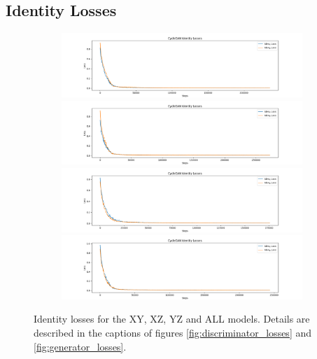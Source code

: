\documentclass[12pt, fleqn, titlepage]{article}
\newcommand{\1}[1]{\mathds{1}\left[#1\right]}
\begin{document}
\subsection{Identity Losses}\label{iden_loss}
\begin{figure}[H]
	\centering
	\begin{subfigure}[b]{0.8\textwidth}
		\centering
		\includegraphics[width=\linewidth]{imgs/identity_losses/XY_model_identity_losses}
		\hfill
		\includegraphics[width=\linewidth]{imgs/identity_losses/XZ_model_identity_losses}
		\hfill
		\includegraphics[width=\linewidth]{imgs/identity_losses/YZ_model_identity_losses}
		\hfill
		\includegraphics[width=\linewidth]{imgs/identity_losses/ALL_model_identity_losses}
	\end{subfigure}
	\caption{Identity losses for the XY, XZ, YZ and ALL models. Details are described in the captions of figures \ref{fig:discriminator_losses} and \ref{fig:generator_losses}.}
	\label{fig:cycle_losses}
\end{figure}
\end{document}
